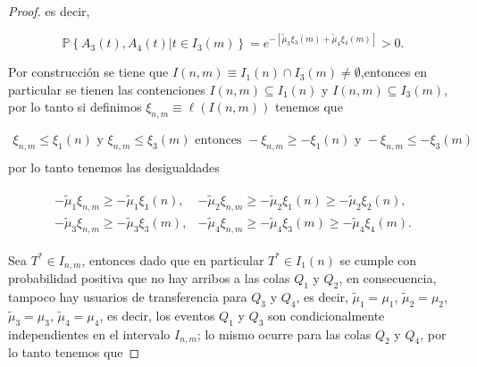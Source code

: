 \documentclass{article}
\newcommand{\prob}{\mathbb{P}}
\numberwithin{equation}{section}
\begin{document}
{\begin{proof}
es decir, 

\begin{equation}
\prob\left\{A_{3}\left(t\right),A_{4}\left(t\right)|t\in I_{3}\left(m\right)\right\}
=e^{-\left[\tilde{\mu}_{3}\xi_{3}\left(m\right)+\tilde{\mu}_{4}\xi_{4}
\left(m\right)\right]}>0.
\end{equation}

Por construcci\'on se tiene que $I\left(n,m\right)\equiv I_{1}\left(n\right)\cap I_{3}\left(m\right)\neq\emptyset$,entonces en particular se tienen las contenciones $I\left(n,m\right)\subseteq I_{1}\left(n\right)$ y $I\left(n,m\right)\subseteq I_{3}\left(m\right)$, por lo tanto si definimos $\xi_{n,m}\equiv\ell\left(I\left(n,m\right)\right)$ tenemos que

\begin{eqnarray*}
\xi_{n,m}\leq\xi_{1}\left(n\right)\textrm{ y }\xi_{n,m}\leq\xi_{3}\left(m\right)\textrm{ entonces }
-\xi_{n,m}\geq-\xi_{1}\left(n\right)\textrm{ y }-\xi_{n,m}\leq-\xi_{3}\left(m\right)\\
\end{eqnarray*}
por lo tanto tenemos las desigualdades 



\begin{eqnarray*}
\begin{array}{ll}
-\tilde{\mu}_{1}\xi_{n,m}\geq-\tilde{\mu}_{1}\xi_{1}\left(n\right),&
-\tilde{\mu}_{2}\xi_{n,m}\geq-\tilde{\mu}_{2}\xi_{1}\left(n\right)
\geq-\tilde{\mu}_{2}\xi_{2}\left(n\right),\\
-\tilde{\mu}_{3}\xi_{n,m}\geq-\tilde{\mu}_{3}\xi_{3}\left(m\right),&
-\tilde{\mu}_{4}\xi_{n,m}\geq-\tilde{\mu}_{4}\xi_{3}\left(m\right)
\geq-\tilde{\mu}_{4}\xi_{4}\left(m\right).
\end{array}
\end{eqnarray*}

Sea $T^{*}\in I_{n,m}$, entonces dado que en particular $T^{*}\in I_{1}\left(n\right)$ se cumple con probabilidad positiva que no hay arribos a las colas $Q_{1}$ y $Q_{2}$, en consecuencia, tampoco hay usuarios de transferencia para $Q_{3}$ y $Q_{4}$, es decir, $\tilde{\mu}_{1}=\mu_{1}$, $\tilde{\mu}_{2}=\mu_{2}$, $\tilde{\mu}_{3}=\mu_{3}$, $\tilde{\mu}_{4}=\mu_{4}$, es decir, los eventos $Q_{1}$ y $Q_{3}$ son condicionalmente independientes en el intervalo $I_{n,m}$; lo mismo ocurre para las colas $Q_{2}$ y $Q_{4}$, por lo tanto tenemos que



\end{proof}}
\end{document}

